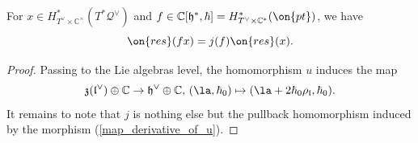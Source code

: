 \documentclass[12pt]{amsart}
\begin{document}
\begin{lemma}\label{lemma_twisting_restriction}
For $x \in H^*_{T^\vee \times \mathbb{C}^\times}(T^*\mathcal{Q}^\vee)$     and $f \in \mathbb{C}[\mathfrak{h}^*,\hbar]=H^*_{T^\vee \times \mathbb{C}^*}(\on{pt})$, we have 
\begin{equation*}
\on{res}(fx)=j(f)\on{res}(x).
\end{equation*}
\end{lemma}
\begin{proof}
Passing to the Lie algebras level, the homomorphism $u$ induces the map 
\begin{equation}\label{map_derivative_of_u}
\mathfrak{z}(\mathfrak{l}^\vee) \oplus \mathbb{C} \rightarrow \mathfrak{h}^\vee \oplus \mathbb{C},\,(\la,\hbar_0) \mapsto (\la+2\hbar_0\rho_\mathfrak{l},\hbar_0).
\end{equation}
It remains to note that $j$ is nothing else but the pullback homomorphism induced by the morphism (\ref{map_derivative_of_u}). 
\end{proof}



\end{document}
